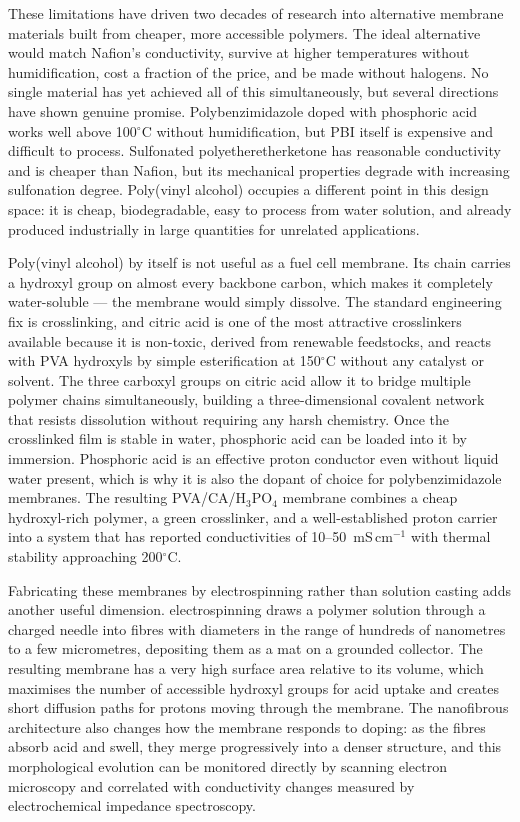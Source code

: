 \documentclass[12pt,a4paper]{report}
\begin{document}
These limitations have driven two decades of research 
into alternative membrane materials built from cheaper, 
more accessible polymers. The ideal alternative would 
match Nafion's conductivity, survive at higher 
temperatures without humidification, cost a fraction 
of the price, and be made without halogens. No single 
material has yet achieved all of this simultaneously, 
but several directions have shown genuine promise. 
Polybenzimidazole doped with phosphoric acid works well 
above 100\(^\circ\)C without humidification, but PBI 
itself is expensive and difficult to process.\cite{20} 
Sulfonated polyetheretherketone has reasonable 
conductivity and is cheaper than Nafion, but its 
mechanical properties degrade with increasing sulfonation 
degree.\cite{18,19} Poly(vinyl alcohol) occupies a 
different point in this design space: it is cheap, 
biodegradable, easy to process from water solution, 
and already produced industrially in large quantities 
for unrelated applications.\cite{9,10}

Poly(vinyl alcohol) by itself is not useful as a fuel 
cell membrane. Its chain carries a hydroxyl group on 
almost every backbone carbon, which makes it completely 
water-soluble — the membrane would simply dissolve. 
The standard engineering fix is crosslinking, and citric 
acid is one of the most attractive crosslinkers available 
because it is non-toxic, derived from renewable feedstocks, 
and reacts with PVA hydroxyls by simple esterification 
at 150\(^\circ\)C without any catalyst or solvent.\cite{50,51} 
The three carboxyl groups on citric acid allow it to 
bridge multiple polymer chains simultaneously, building 
a three-dimensional covalent network that resists 
dissolution without requiring any harsh 
chemistry.\cite{48,53} Once the crosslinked film is 
stable in water, phosphoric acid can be loaded into 
it by immersion. Phosphoric acid is an effective proton 
conductor even without liquid water present, which 
is why it is also the dopant of choice for 
polybenzimidazole membranes.\cite{21,55} The resulting 
PVA/CA/H\(_3\)PO\(_4\) membrane combines a cheap 
hydroxyl-rich polymer, a green crosslinker, and a 
well-established proton carrier into a system that 
has reported conductivities of 10--50~mS\,cm\(^{-1}\) 
with thermal stability approaching 
200\(^\circ\)C.\cite{9,12,13}

Fabricating these membranes by electrospinning rather 
than solution casting adds another useful dimension. 
electrospinning draws a polymer solution through a 
charged needle into fibres with diameters in the 
range of hundreds of nanometres to a few micrometres, 
depositing them as a mat on a grounded 
collector.\cite{37,38} The resulting membrane has a 
very high surface area relative to its volume, which 
maximises the number of accessible hydroxyl groups 
for acid uptake and creates short diffusion paths 
for protons moving through the 
membrane.\cite{40,41,42} The nanofibrous architecture 
also changes how the membrane responds to doping: 
as the fibres absorb acid and swell, they merge 
progressively into a denser structure, and this 
morphological evolution can be monitored directly 
by scanning electron microscopy and correlated with 
conductivity changes measured by electrochemical 
impedance spectroscopy.\cite{39,52}
\end{document}
